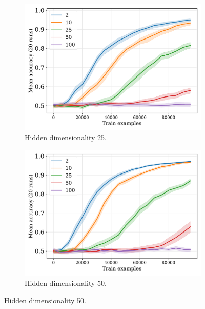 \documentclass{article}
\begin{document}
\begin{figure}[H]
  \begin{subfigure}{0.45\linewidth}
    \includegraphics[width=1\textwidth]{./flatpremack-h1-train_size-embed_dim-hidden_dim=25.pdf}
    \caption{Hidden dimensionality 25.}
  \end{subfigure}
  \hfill
  \begin{subfigure}{0.45\linewidth}
    \includegraphics[width=1\textwidth]{./flatpremack-h1-train_size-embed_dim-hidden_dim=50.pdf}
    \caption{Hidden dimensionality 50.}
  \end{subfigure}

  \vspace{24pt}


\end{figure}
\end{document}

